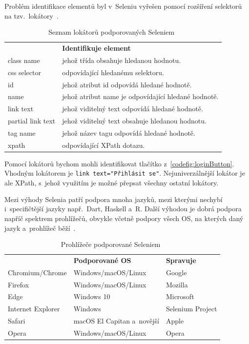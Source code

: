 \documentclass[12pt, a4paper, twoside]{article}
\begin{document}
	\newpage
	Problém identifikace elementů byl v~Seleniu vyřešen pomocí rozšíření selektorů na tzv.~lokátory~\cite{seleniumDocs}.
	{
	\begin{table}[H]
		\centering
	\begin{tabular}{ l|l }
	\rowcolor{tableHeadingBackground} \multicolumn{1}{l}{\textbf{Lokátor}} & \multicolumn{1}{l}{\textbf{Identifikuje element}} \\
	class name &  jehož třída obsahuje hledanou hodnotu.\\ 
	css selector & odpovídající hledanému selektoru. \\ 
	id & jehož atribut id odpovídá hledané hodnotě. \\
	name & jehož atribut name je odpovídající hledané hodnotě. \\
	link text & jehož viditelný text odpovídá hledané hodnotě. \\
	partial link text & jehož viditelný text obsahuje hledanou hodnotu.  \\
	tag name & jehož název tagu odpovídá hledané hodnotě. \\
	xpath & odpovídající XPath dotazu. \\
	\end{tabular}
	\caption{Seznam lokátorů podporovaných Seleniem~\cite{seleniumDocs}}
	\label{tab:locatorsList}
	\end{table}
	}

	Pomocí lokátorů bychom mohli identifikovat tlačítko z~\cref{codefig:loginButton}. Vhodným lokátorem je \texttt{link text="Přihlásit se"}. Nejuniverzálnější lokátor je ale XPath, s~jehož využitím je možné přepsat všechny ostatní lokátory.

	Mezi výhody Selenia patří podpora mnoha jazyků, mezi kterými nechybí i~specifičtější jazyky např.~Dart, Haskell a~R. Další výhodou je dobrá podpora napříč spektrem prohlížečů, obvykle včetně podpory všech OS, na kterých daný jazyk a~prohlížeč běží~\cite{seleniumDocs, seleniumEcosystem}.
	
	\begin{table}[H]
		\centering
		\begin{tabular}{ l|l|l } 
			\rowcolor{tableHeadingBackground}
			\multicolumn{1}{l}{\textbf{Prohlížeč}} & \multicolumn{1}{l}{\textbf{Podporované OS}} & \multicolumn{1}{l}{\textbf{Spravuje}}  \\
			Chromium/Chrome & Windows/macOS/Linux & Google \\ 
			Firefox & Windows/macOS/Linux & Mozilla \\ 
			Edge & Windows 10 & Microsoft \\
			Internet Explorer & Windows & Selenium Project \\
			Safari & macOS El Capitan a~novější & Apple \\
			Opera & Windows/macOS/Linux & Opera
		\end{tabular}
		\caption{Prohlížeče podporované Seleniem~\cite{seleniumDocs}}
	\end{table}
	
\end{document}
